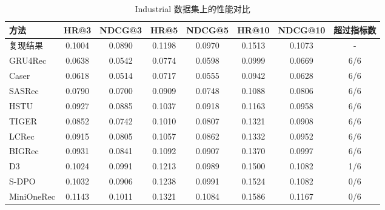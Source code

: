 \documentclass[11pt]{article}
\begin{document}
\begin{table}[htbp]
  \centering
  \caption{Industrial 数据集上的性能对比\protect\footnotemark[1]}
  \small
  \begin{tabular}{l *{6}{S[table-format=1.4]} c}
    \toprule
    方法 & {HR@3} & {NDCG@3} & {HR@5} & {NDCG@5} & {HR@10} & {NDCG@10} & {超过指标数} \\
    \midrule
    复现结果 & 0.1004 & 0.0890 & 0.1198 & 0.0970 & 0.1513 & 0.1073 & - \\
    GRU4Rec & 0.0638 & 0.0542 & 0.0774 & 0.0598 & 0.0999 & 0.0669 & 6/6 \\
    Caser & 0.0618 & 0.0514 & 0.0717 & 0.0555 & 0.0942 & 0.0628 & 6/6 \\
    SASRec & 0.0790 & 0.0700 & 0.0909 & 0.0748 & 0.1088 & 0.0806 & 6/6 \\
    HSTU & 0.0927 & 0.0885 & 0.1037 & 0.0918 & 0.1163 & 0.0958 & 6/6 \\
    TIGER & 0.0852 & 0.0742 & 0.1010 & 0.0807 & 0.1321 & 0.0908 & 6/6 \\
    LCRec & 0.0915 & 0.0805 & 0.1057 & 0.0862 & 0.1332 & 0.0952 & 6/6 \\
    BIGRec & 0.0931 & 0.0841 & 0.1092 & 0.0907 & 0.1370 & 0.0997 & 6/6 \\
    D3 & 0.1024 & 0.0991 & 0.1213 & 0.0989 & 0.1500 & 0.1082 & 1/6 \\
    S-DPO & 0.1032 & 0.0906 & 0.1238 & 0.0991 & 0.1524 & 0.1082 & 0/6 \\
    MiniOneRec & 0.1143 & 0.1011 & 0.1321 & 0.1084 & 0.1586 & 0.1167 & 0/6 \\
    \bottomrule
  \end{tabular}
\end{table}
\end{document}
